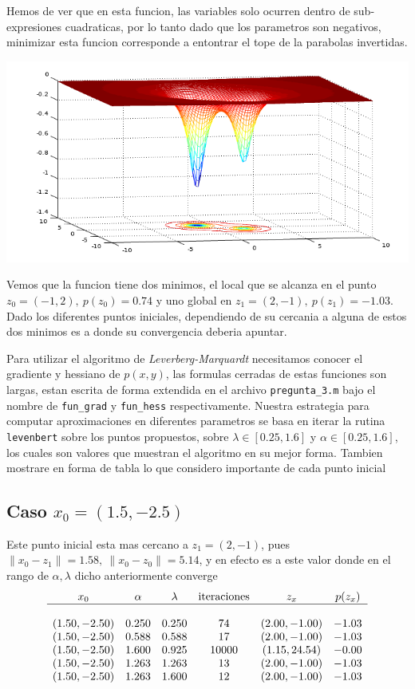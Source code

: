 \documentclass[letterpaper]{article}
\begin{document}
Hemos de ver que en esta funcion, las variables solo ocurren dentro de
sub-expresiones cuadraticas, por lo tanto dado que los parametros son
negativos, minimizar esta funcion corresponde a entontrar el tope de la
parabolas invertidas.
\begin{center}
  \includegraphics[scale=0.8]{pregunta2.png}
\end{center}
Vemos que la funcion tiene dos minimos, el local que se alcanza en el
punto \(z_0 = (-1, 2),\ p(z_0) = 0.74\) y uno global en \(z_1 = (2,-1),\
p(z_1) = -1.03\). Dado los diferentes puntos iniciales, dependiendo de su
cercania a alguna de estos dos minimos es a donde su convergencia deberia
apuntar.

Para utilizar el algoritmo de \emph{Leverberg-Marquardt}
necesitamos conocer el gradiente y hessiano de \(p(x,y)\), las formulas
cerradas de estas funciones son largas, estan escrita de forma extendida
en el archivo \texttt{pregunta\_3.m} bajo el nombre de \texttt{fun\_grad}
y \texttt{fun\_hess} respectivamente. Nuestra estrategia para computar
aproximaciones en diferentes parametros se basa en iterar la rutina
\texttt{levenbert} sobre los puntos propuestos, sobre \(\lambda \in
[0.25, 1.6]\) y \(\alpha \in [0.25, 1.6]\), los cuales son valores que
muestran el algoritmo en su mejor forma. Tambien mostrare en forma de
tabla lo que considero importante de cada punto inicial

\subsection*{Caso \(x_0 = (1.5, -2.5)\)}
Este punto inicial esta mas cercano a \(z_1 = (2, -1)\), pues \(\lVert
x_0 - z_1 \rVert = 1.58,\ \lVert x_0 - z_0 \rVert = 5.14\), y en efecto
es a este valor donde en el rango de \(\alpha, \lambda\) dicho
anteriormente converge
\[
\begin{array}{c c c c c c}
  x_0 & \alpha & \lambda & \text{iteraciones} & z_x & p(z_{x}) \\
  \hline \\
  (1.50, -2.50) & 0.250 & 0.250 & 74     & (2.00, -1.00) & -1.03 \\
  (1.50, -2.50) & 0.588 & 0.588 & 17     & (2.00, -1.00) & -1.03 \\
  (1.50, -2.50) & 1.600 & 0.925 & 10000  & (1.15, 24.54) & -0.00 \\
  (1.50, -2.50) & 1.263 & 1.263 & 13     & (2.00, -1.00) & -1.03 \\
  (1.50, -2.50) & 1.263 & 1.600 & 12     & (2.00, -1.00) & -1.03 \\
\end{array}
\]
\end{document}
